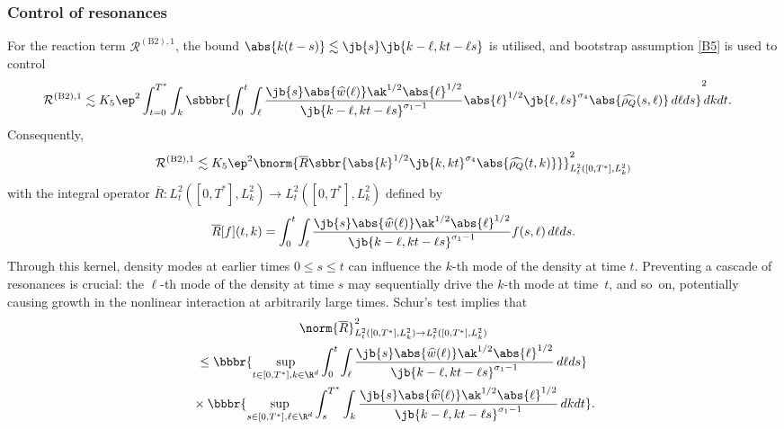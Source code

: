 \subsubsection{Control of resonances}\label{resonancessection}
For the reaction term $\mathcal{R}^{\mathrm{(B2),1}}$, the bound $\abs{k(t-s)}\lesssim\jb{s}\jb{k-\ell,kt-\ell s}$ is utilised, and bootstrap assumption \eqref{B5} is used to control\vspace*{-3pt}
\begin{align*}
\mathcal{R}^{\mathrm{(B2),1}}&\lesssim K_5\ep^2\int_{t=0}^{T^*}\int_k\sbbbr{\int_0^t\int_\ell\frac{\jb{s}\abs{\widehat w(\ell)}\ak^{1/2} \abs{\ell}^{1/2}}{\jb{k-\ell,kt-\ell s}^{\sigma_1-1}}\abs{\ell}^{1/2}\jb{\ell,\ell s}^{\sigma_4}\abs{\widehat{\rho_Q}(s,\ell)}\,d\ell ds}^2\hspace{-0.1cm}dkdt.
\end{align*}
Consequently,\vspace*{-3pt}
\begin{align}\label{tobeapplied}\mathcal{R}^{\mathrm{(B2),1}}\lesssim K_5\ep^2\bnorm{\overline R\sbbr{\abs{k}^{1/2}\jb{k,kt}^{\sigma_4}\abs{\widehat{\rho_Q}(t,k)}}}_{L^2_{t}([0,T^*],L^2_k)}^2\end{align} with the integral operator $\overline R\colon L^2_{t}([0,T^*],L^2_k)\to L^2_{t}([0,T^*],L^2_k)$ defined by\vspace*{-3pt}
\begin{align}\label{Rintegraloperator}
\overline R[f](t,k)=\int_0^t\int_\ell\frac{\jb{s}\abs{\widehat w(\ell)}\ak^{1/2} \abs{\ell}^{1/2}}{\jb{k-\ell,kt-\ell s}^{\sigma_1-1}}f(s,\ell)\,d\ell ds.
\end{align}
Through this kernel, density modes at earlier times $0\leq s\leq t$ can influence the $k$\nobreakdash-th mode of the density at time $t$. Preventing a cascade of resonances is crucial: the $\ell$\nobreakdash-th mode of the density at time $s$ may sequentially drive the $k$-th mode at time~$t$, and so~on, potentially causing growth in the nonlinear interaction at arbitrarily large times. Schur's test implies that\vspace*{-5pt}
\begin{multline}\label{Schurintegrals}
\norm{\overline R}_{L^2_{t}([0,T^*],L^2_k)\to L^2_{t}([0,T^*],L^2_k)}^2\\
\leq \bbbr{\sup_{t\in[0,T^*],k\in\R^d}\int_0^t\int_\ell \frac{\jb{ s }\abs{\widehat w(\ell)}\ak^{1/2}\abs{\ell}^{1/2}}{\jb{k-\ell,kt-\ell s }^{\sigma_1-1}}\,d\ell d s }\\
{}\times\bbbr{\sup_{ s \in[0,T^*],\ell\in\R^d}\int_{ s }^{T^*}\int_k \frac{\jb{ s }\abs{\widehat w(\ell)}\ak^{1/2}\abs{\ell}^{1/2}}{\jb{k-\ell,kt-\ell s }^{\sigma_1-1}}\,dk d t }.
\end{multline}
